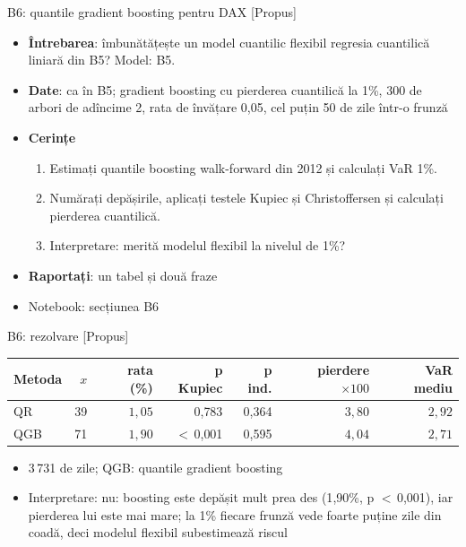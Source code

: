 \begin{frame}{B6: quantile gradient boosting pentru DAX [Propus]}
\itemsize{\footnotesize}
\begin{itemize}
\item \textbf{Întrebarea}: îmbunătățește un model cuantilic flexibil regresia cuantilică liniară din B5? Model: B5.
\item \textbf{Date}: ca în B5; gradient boosting cu pierderea cuantilică la 1\%, 300 de arbori de adîncime 2, rata de învățare 0,05, cel puțin 50 de zile într-o frunză
\item \textbf{Cerințe}
\begin{enumerate}
    \item Estimați quantile boosting walk-forward din 2012 și calculați VaR 1\%.
    \item Numărați depășirile, aplicați testele Kupiec și Christoffersen și calculați pierderea cuantilică.
    \item Interpretare: merită modelul flexibil la nivelul de 1\%?
\end{enumerate}
\item \textbf{Raportați}: un tabel și două fraze
\item Notebook: secțiunea B6
\end{itemize}
\end{frame}

\ifsolutions
\begin{frame}{B6: rezolvare [Propus]}
\itemsize{\footnotesize}
\begin{center}
\footnotesize
\begin{tabular}{lrrrrrr}
\toprule
Metoda & $x$ & rata (\%) & p Kupiec & p ind. & pierdere $\times 100$ & VaR mediu \\
\midrule
QR & 39 & $1{,}05$ & 0{,}783 & 0{,}364 & $3{,}80$ & $2{,}92$ \\
QGB & 71 & $1{,}90$ & $<$\,0{,}001 & 0{,}595 & $4{,}04$ & $2{,}71$ \\
\bottomrule
\end{tabular}
\end{center}
\begin{itemize}
    \item 3\,731 de zile; QGB: quantile gradient boosting
    \item Interpretare: nu: boosting este depășit mult prea des (1{,}90\%, p $<$\,0{,}001), iar pierderea lui este mai mare; la 1\% fiecare frunză vede foarte puține zile din coadă, deci modelul flexibil subestimează riscul
\end{itemize}
\end{frame}
\fi


